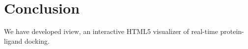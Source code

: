\documentclass{bioinfo}
\begin{document}
\section{Conclusion}

We have developed iview, an interactive HTML5 visualizer of real-time protein-ligand docking.


%
%
%
%
%
%


\end{document}
